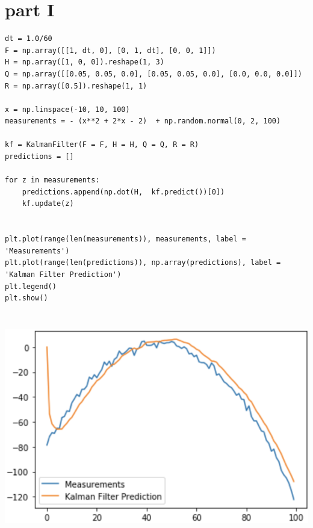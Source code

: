\documentclass[a4paper,11pt]{article}
\makeatletter
\newcommand{\problemquestion}[1]{\gdef\@problemquestion{#1}}%
\theoremstyle{mytheor}
\makeatother
\begin{document}
\section*{part I}
\begin{problem}
  \problemquestion{generate some data and show that your implementation of KF is correct}
\end{problem}

\begin{lstlisting}
dt = 1.0/60
F = np.array([[1, dt, 0], [0, 1, dt], [0, 0, 1]])
H = np.array([1, 0, 0]).reshape(1, 3)
Q = np.array([[0.05, 0.05, 0.0], [0.05, 0.05, 0.0], [0.0, 0.0, 0.0]])
R = np.array([0.5]).reshape(1, 1)

x = np.linspace(-10, 10, 100)
measurements = - (x**2 + 2*x - 2)  + np.random.normal(0, 2, 100)

kf = KalmanFilter(F = F, H = H, Q = Q, R = R)
predictions = []

for z in measurements:
    predictions.append(np.dot(H,  kf.predict())[0])
    kf.update(z)


plt.plot(range(len(measurements)), measurements, label = 'Measurements')
plt.plot(range(len(predictions)), np.array(predictions), label = 'Kalman Filter Prediction')
plt.legend()
plt.show()
\end{lstlisting}{}

\includegraphics[width=15cm, height=10cm]{I.png}
\end{document}
